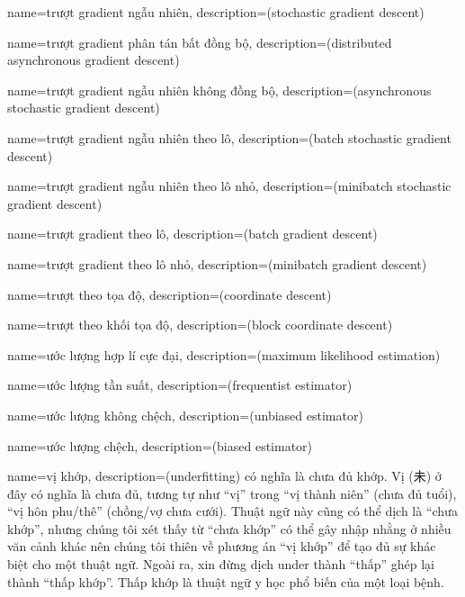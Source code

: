 {
    name={trượt gradient ngẫu nhiên},
    description={(stochastic gradient descent)}
}

{
    name={trượt gradient phân tán bất đồng bộ},
    description={(distributed asynchronous gradient descent)}
}


{
    name={trượt gradient ngẫu nhiên không đồng bộ},
    description={(asynchronous stochastic gradient descent)}
}

{
    name={trượt gradient ngẫu nhiên theo lô},
    description={(batch stochastic gradient descent)}
}

{
    name={trượt gradient ngẫu nhiên theo lô nhỏ},
    description={(minibatch stochastic gradient descent)}
}

{
    name={trượt gradient theo lô},
    description={(batch gradient descent)}
}

{
    name={trượt gradient theo lô nhỏ},
    description={(minibatch gradient descent)}
}

{
    name={trượt theo tọa độ},
    description={(coordinate descent)}
}

{
    name={trượt theo khối tọa độ},
    description={(block coordinate descent)}
}

{
    name={ước lượng hợp lí cực đại},
    description={(maximum likelihood estimation)}
}

{
    name={ước lượng tần suất},
    description={(frequentist estimator)}
}

{
    name={ước lượng không chệch},
    description={(unbiased estimator)}
}

{
    name={ước lượng chệch},
    description={(biased estimator)}
}

{
    name={vị khớp},
    description={(underfitting) có nghĩa là chưa đủ khớp.
    Vị (未) ở đây có nghĩa là chưa đủ, tương tự như ``vị''
    trong ``vị thành niên'' (chưa đủ tuổi), ``vị hôn phu/thê''
    (chồng/vợ chưa cưới). Thuật ngữ này cũng có thể dịch là
    ``chưa khớp'', nhưng chúng tôi xét thấy từ ``chưa khớp''
    có thể gây nhập nhằng ở nhiều văn cảnh khác nên chúng tôi
    thiên về phương án ``vị khớp'' để tạo đủ sự khác biệt
    cho một thuật ngữ. Ngoài ra, xin đừng dịch under thành ``thấp''
    ghép lại thành ``thấp khớp''. Thấp khớp là thuật ngữ y học
    phổ biến của một loại bệnh.}
}

